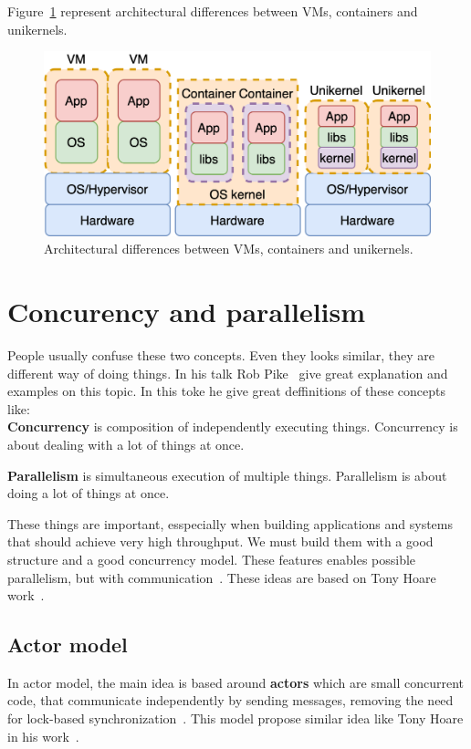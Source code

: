 Figure~\ref{fig:fig5} represent architectural differences between VMs, containers and unikernels.

\begin{figure}[H]
	\begin{center}
		\includegraphics[scale=0.9]{images/Figure5.png}
	\end{center}
	\vspace{-0.6cm}
	\caption{Architectural differences between VMs, containers and unikernels.}
	\label{fig:fig5}
\end{figure}
%
%
\section{Concurency and parallelism}\label{sec:concurency_parallelism}
%
People usually confuse these two concepts. Even they looks similar, they are different way of doing things. In his talk Rob Pike~\cite{Pike} give great explanation and examples on this topic. In this toke he give great deffinitions of these concepts like:\\
\noindent
\textbf{Concurrency} is composition of independently executing things. Concurrency is about dealing with a lot of things at once.

\noindent
\textbf{Parallelism} is simultaneous execution of multiple things. Parallelism is about doing a lot of things at once. 

These things are important, esspecially when building applications and systems that should achieve very high throughput. We must build them with a good structure and a good concurrency model. These features enables possible parallelism, but with communication~\cite{Pike}. These ideas are based on Tony Hoare work~\cite{Hoare78}.

\subsection{Actor model}\label{sec:actor_model}
%
In actor model, the main idea is based around \textbf{actors} which are small concurrent code, that communicate independently by sending messages, removing the need for lock-based synchronization~\cite{Hewitt}. This model propose similar idea like Tony Hoare in his work~\cite{Hoare78}.

